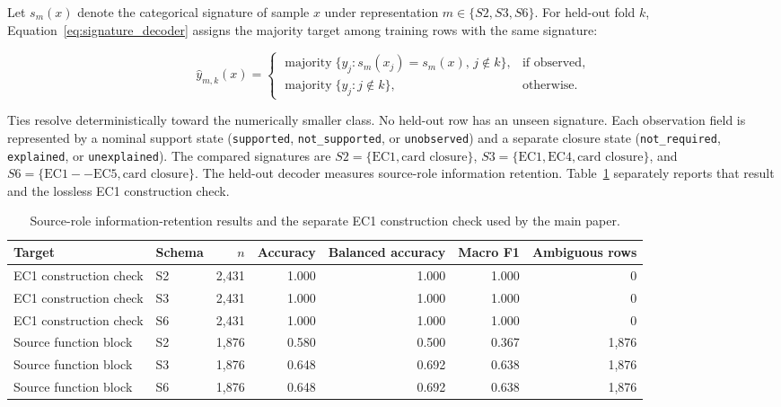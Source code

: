 \documentclass[a4paper,fleqn]{cas-dc}
\begin{document}
Let $s_m(x)$ denote the categorical signature of sample $x$ under representation $m\in\{S2,S3,S6\}$. For held-out fold $k$, Equation~\eqref{eq:signature_decoder} assigns the majority target among training rows with the same signature:

\begin{equation}
\label{eq:signature_decoder}
\widehat{y}_{m,k}(x)=
\begin{cases}
\operatorname{majority}\{y_j:s_m(x_j)=s_m(x),\,j\notin k\}, & \text{if observed},\\
\operatorname{majority}\{y_j:j\notin k\}, & \text{otherwise}.
\end{cases}
\end{equation}

Ties resolve deterministically toward the numerically smaller class. No held-out row has an unseen signature. Each observation field is represented by a nominal support state (\texttt{supported}, \texttt{not\_supported}, or \texttt{unobserved}) and a separate closure state (\texttt{not\_required}, \texttt{explained}, or \texttt{unexplained}). The compared signatures are \(S2=\{\mathrm{EC1},\text{card closure}\}\), \(S3=\{\mathrm{EC1},\mathrm{EC4},\text{card closure}\}\), and \(S6=\{\mathrm{EC1--EC5},\text{card closure}\}\). The held-out decoder measures source-role information retention. Table~\ref{tab:schema_results} separately reports that result and the lossless EC1 construction check.

\begin{table}[t]
\centering
\small
\caption{Source-role information-retention results and the separate EC1 construction check used by the main paper.}
\label{tab:schema_results}
\begin{tabularx}{\textwidth}{>{\raggedright\arraybackslash}Xlrrrrr}
\toprule
Target & Schema & $n$ & Accuracy & Balanced accuracy & Macro F1 & Ambiguous rows \\
\midrule
EC1 construction check & S2 & 2,431 & 1.000 & 1.000 & 1.000 & 0 \\
EC1 construction check & S3 & 2,431 & 1.000 & 1.000 & 1.000 & 0 \\
EC1 construction check & S6 & 2,431 & 1.000 & 1.000 & 1.000 & 0 \\
Source function block & S2 & 1,876 & 0.580 & 0.500 & 0.367 & 1,876 \\
Source function block & S3 & 1,876 & 0.648 & 0.692 & 0.638 & 1,876 \\
Source function block & S6 & 1,876 & 0.648 & 0.692 & 0.638 & 1,876 \\
\bottomrule
\end{tabularx}
\end{table}
\end{document}
